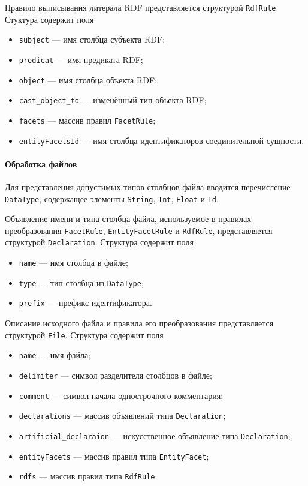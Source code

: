 Правило выписывания литерала RDF представляется структурой \texttt{RdfRule}. Стуктура содержит поля
\begin{itemize}
  \item \texttt{subject} --- имя столбца субъекта RDF;
  \item \texttt{predicat} --- имя предиката RDF;
  \item \texttt{object} --- имя столбца объекта RDF;
  \item \texttt{cast\_object\_to} --- изменённый тип объекта RDF;
  \item \texttt{facets} --- массив правил \texttt{FacetRule};
  \item \texttt{entityFacetsId} --- имя столбца идентификаторов соединительной сущности.
\end{itemize}

\paragraph{Обработка файлов}

Для представления допустимых типов столбцов файла вводится перечисление \texttt{DataType}, содержащее элементы
\texttt{String}, \texttt{Int}, \texttt{Float} и \texttt{Id}.

Объявление имени и типа столбца файла, используемое в правилах преобразования \texttt{FacetRule},
\texttt{EntityFacetRule} и \texttt{RdfRule}, представляется структурой \texttt{Declaration}. Структура содержит поля
\begin{itemize}
  \item \texttt{name} --- имя столбца в файле;
  \item \texttt{type} --- тип столбца из \texttt{DataType};
  \item \texttt{prefix} --- префикс идентификатора.
\end{itemize}

Описание исходного файла и правила его преобразования представляется структурой \texttt{File}. Структура содержит поля
\begin{itemize}
  \item \texttt{name} --- имя файла;
  \item \texttt{delimiter} --- символ разделителя столбцов в файле;
  \item \texttt{comment} --- символ начала однострочного комментария;
  \item \texttt{declarations} --- массив объявлений типа \texttt{Declaration};
  \item \texttt{artificial\_declaraion} --- искусственное объявление типа \texttt{Declaration};
  \item \texttt{entityFacets} --- массив правил типа \texttt{EntityFacet};
  \item \texttt{rdfs} --- массив правил типа \texttt{RdfRule}.
\end{itemize}

